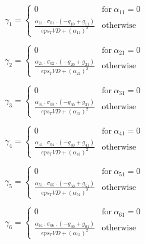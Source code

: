 \documentclass{article}
\begin{document}
\begin{dmath}\gamma_{1} = \begin{cases} 0 & \text{for}\: \alpha_{11} = 0 \\\frac{\alpha_{11} \,.\, \sigma_{0 1} \,.\, \left(- g_{10} + g_{11}\right)}{eps_TVD + \left(\alpha_{11} \right)^{2}} & \text{otherwise} \end{cases}\end{dmath}

\begin{dmath}\gamma_{2} = \begin{cases} 0 & \text{for}\: \alpha_{21} = 0 \\\frac{\alpha_{21} \,.\, \sigma_{0 2} \,.\, \left(- g_{20} + g_{21}\right)}{eps_TVD + \left(\alpha_{21} \right)^{2}} & \text{otherwise} \end{cases}\end{dmath}

\begin{dmath}\gamma_{3} = \begin{cases} 0 & \text{for}\: \alpha_{31} = 0 \\\frac{\alpha_{31} \,.\, \sigma_{0 3} \,.\, \left(- g_{30} + g_{31}\right)}{eps_TVD + \left(\alpha_{31} \right)^{2}} & \text{otherwise} \end{cases}\end{dmath}

\begin{dmath}\gamma_{4} = \begin{cases} 0 & \text{for}\: \alpha_{41} = 0 \\\frac{\alpha_{41} \,.\, \sigma_{0 4} \,.\, \left(- g_{40} + g_{41}\right)}{eps_TVD + \left(\alpha_{41} \right)^{2}} & \text{otherwise} \end{cases}\end{dmath}

\begin{dmath}\gamma_{5} = \begin{cases} 0 & \text{for}\: \alpha_{51} = 0 \\\frac{\alpha_{51} \,.\, \sigma_{0 5} \,.\, \left(- g_{50} + g_{51}\right)}{eps_TVD + \left(\alpha_{51} \right)^{2}} & \text{otherwise} \end{cases}\end{dmath}

\begin{dmath}\gamma_{6} = \begin{cases} 0 & \text{for}\: \alpha_{61} = 0 \\\frac{\alpha_{61} \,.\, \sigma_{0 6} \,.\, \left(- g_{60} + g_{61}\right)}{eps_TVD + \left(\alpha_{61} \right)^{2}} & \text{otherwise} \end{cases}\end{dmath}
\end{document}
